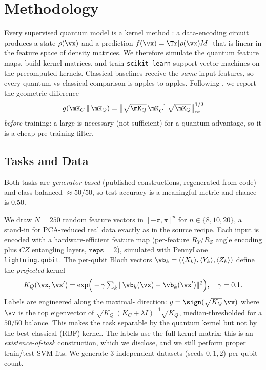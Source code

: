 \section{Methodology}
\label{sec:method}

 Every supervised quantum model is a kernel method
\citep{schuld2021models}: a data-encoding circuit produces a state $\rho(\vx)$ and
a prediction $f(\vx)=\Tr[\rho(\vx)M]$ that is linear in the feature space of
density matrices. We therefore simulate the quantum feature maps, build kernel
matrices, and train \texttt{scikit-learn} support vector machines on the
precomputed kernels. Classical baselines receive the \emph{same} input features,
so every quantum-vs-classical comparison is apples-to-apples. Following
\citet{huang2021power}, we report the geometric difference
\begin{equation}
\gdiff(\mK_C \,\|\, \mK_Q) = \big\| \sqrt{\mK_Q}\, \mK_C^{-1}\, \sqrt{\mK_Q} \big\|_\infty^{1/2}
\label{eq:gdiff}
\end{equation}
\emph{before} training: a large \gdiff{} is necessary (not sufficient) for a
quantum advantage, so it is a cheap pre-training filter.

\subsection{Tasks and Data}
\label{sec:data}

Both tasks are \emph{generator-based} (published constructions, regenerated from
code) and class-balanced $\approx 50/50$, so test accuracy is a meaningful metric
and chance is $0.50$.

 We draw $N=250$ random feature vectors in $[-\pi,\pi]^n$
for $n\in\{8,10,20\}$, a stand-in for PCA-reduced real data exactly as in the
source recipe. Each input is encoded with a hardware-efficient feature map
(per-feature $R_Y$/$R_Z$ angle encoding plus $CZ$ entangling layers, $\texttt{reps}=2$),
simulated with PennyLane \texttt{lightning.qubit}. The per-qubit Bloch vectors
$\vb_k=(\langle X_k\rangle,\langle Y_k\rangle,\langle Z_k\rangle)$ define the
\emph{projected} kernel
\begin{equation}
K_Q(\vx,\vx') = \exp\!\Big(-\gamma \textstyle\sum_k \|\vb_k(\vx)-\vb_k(\vx')\|^2\Big),
\quad \gamma=0.1 .
\label{eq:projkernel}
\end{equation}
Labels are engineered along the maximal-\gdiff{} direction:
$y=\sign(\sqrt{K_Q}\,\vv)$ where $\vv$ is the top eigenvector of
$\sqrt{K_Q}\,(K_C+\lambda I)^{-1}\sqrt{K_Q}$, median-thresholded for a $50/50$
balance. This makes the task separable by the quantum kernel but not by the best
classical (RBF) kernel.  The labels use the full kernel matrix:
this is an \emph{existence-of-task} construction, which we disclose, and we still
perform proper train/test SVM fits. We generate $3$ independent datasets
(seeds $0,1,2$) per qubit count.


